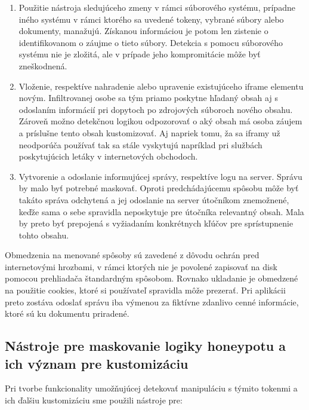 \documentclass[conference, 11pt,slovak,a4paper,twoside]{IEEEtran}
\begin{document}
\begin{enumerate}
	\item Použitie nástroja sledujúceho zmeny v rámci súborového systému, prípadne iného systému v rámci ktorého sa uvedené tokeny, vybrané súbory alebo dokumenty, manažujú. Získanou informáciou je potom len zistenie o identifikovanom o záujme o tieto súbory. Detekcia s pomocu súborového systému nie je zložitá, ale v prípade jeho kompromitácie môže byť zneškodnená.
	
	\item Vloženie, respektíve nahradenie alebo upravenie existujúceho iframe elementu novým. Infiltrovanej osobe sa tým priamo poskytne hľadaný obsah aj s odoslaním informácií pri dopytoch po zdrojových súboroch nového obsahu. Zároveň možno detekčnou logikou odpozorovať o aký obsah má osoba záujem a príslušne tento obsah kustomizovať. Aj napriek tomu, ža sa iframy už neodporúča používať tak sa stále vyskytujú napríklad pri službách poskytujúcich letáky v internetových obchodoch.

	\item Vytvorenie a odoslanie informujúcej správy, respektíve logu na server. Správu by malo byť potrebné maskovať. Oproti predchádajúcemu spôsobu môže byť takáto správa odchytená a jej odoslanie na server útočníkom znemožnené, keďže sama o sebe spravidla neposkytuje pre útočníka relevantný obsah. Mala by preto byť prepojená s vyžiadaním konkrétnych kľúčov pre sprístupnenie tohto obsahu. 
\end{enumerate}
 
Obmedzenia na menované spôsoby sú zavedené z dôvodu ochrán pred internetovými hrozbami, v rámci ktorých nie je povolené zapisovať na disk pomocou prehliadača štandardným spôsobom. Rovnako ukladanie je obmedzené na použitie cookies, ktoré si používateľ spravidla môže prezerať. Pri aplikácii preto zostáva odoslať správu iba výmenou za fiktívne zdanlivo cenné informácie, ktoré sú ku dokumentu priradené.
  

\subsection{Nástroje pre maskovanie logiky honeypotu a ich význam pre kustomizáciu}

Pri tvorbe funkcionality umožňujúcej detekovať manipuláciu s týmito tokenmi a ich ďalšiu kustomizáciu sme použili nástroje pre:
\end{document}
